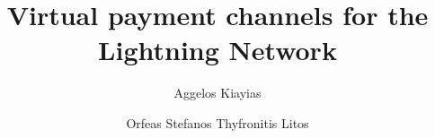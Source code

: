\title{Virtual payment channels for the Lightning Network}
\author{Aggelos Kiayias \and Orfeas Stefanos Thyfronitis Litos}
%
\maketitle
